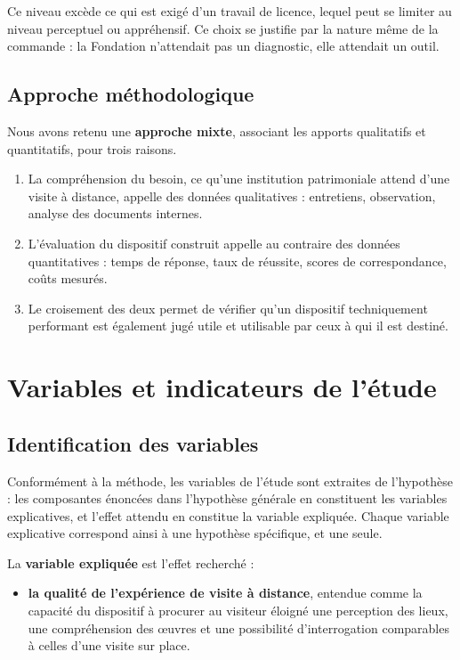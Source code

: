 Ce niveau excède ce qui est exigé d'un travail de licence, lequel peut se
limiter au niveau perceptuel ou appréhensif. Ce choix se justifie par la nature
même de la commande : la Fondation n'attendait pas un diagnostic, elle attendait
un outil.

\subsection{Approche méthodologique}

Nous avons retenu une \textbf{approche mixte}, associant les apports qualitatifs
et quantitatifs, pour trois raisons.

\begin{enumerate}
  \item La compréhension du besoin, ce qu'une institution patrimoniale attend
        d'une visite à distance, appelle des données qualitatives : entretiens,
        observation, analyse des documents internes.
  \item L'évaluation du dispositif construit appelle au contraire des données
        quantitatives : temps de réponse, taux de réussite, scores de
        correspondance, coûts mesurés.
  \item Le croisement des deux permet de vérifier qu'un dispositif
        techniquement performant est également jugé utile et utilisable par
        ceux à qui il est destiné.
\end{enumerate}

\section{Variables et indicateurs de l'étude}
\label{sec:variables}

\subsection{Identification des variables}

Conformément à la méthode, les variables de l'étude sont extraites de
l'hypothèse : les composantes énoncées dans l'hypothèse générale en constituent
les variables explicatives, et l'effet attendu en constitue la variable
expliquée. Chaque variable explicative correspond ainsi à une hypothèse
spécifique, et une seule.

La \textbf{variable expliquée} est l'effet recherché :

\begin{itemize}
  \item \textbf{la qualité de l'expérience de visite à distance}, entendue comme
        la capacité du dispositif à procurer au visiteur éloigné une perception
        des lieux, une compréhension des œuvres et une possibilité
        d'interrogation comparables à celles d'une visite sur place.
\end{itemize}

